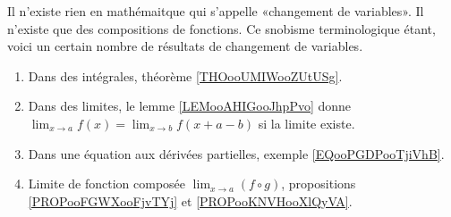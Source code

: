 
Il n'existe rien en mathémaitque qui s'appelle «changement de variables». Il n'existe que des compositions de fonctions. Ce snobisme terminologique étant, voici un certain nombre de résultats de changement de variables.
\begin{enumerate}
	\item
	      Dans des intégrales, théorème \ref{THOooUMIWooZUtUSg}.
	\item
	      Dans des limites, le lemme \ref{LEMooAHIGooJhpPvo} donne \( \lim_{x\to a} f(x)=\lim_{x\to b}f(x+a-b)\) si la limite existe.
	\item
	      Dans une équation aux dérivées partielles, exemple \ref{EQooPGDPooTjiVhB}.
      \item
          Limite de fonction composée \( \lim_{x\to a}(f\circ g) \), propositions \ref{PROPooFGWXooFjvTYj} et \ref{PROPooKNVHooXlQyVA}. 
\end{enumerate}

